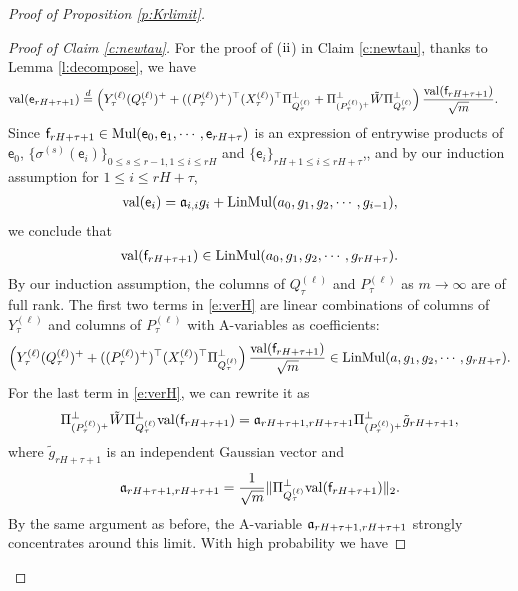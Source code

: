 \documentclass{article}
\numberwithin{equation}{section}
\newcommand{\fa}{{\frak a}}
\newcommand{\sfe}{{\mathsf e}}
\newcommand{\sff}{{\mathsf f}}
\renewcommand{\leq}{\leqslant}
\newcommand{\1}{\mathds{1}}
\theoremstyle{plain} %
\newcommand{\val}{{\rm val}}
\newcommand{\LinMul}{{\rm LinMul}}
\newcommand{\Mul}{{\rm Mul}}
\begin{document}
\begin{proof}[Proof of Proposition \ref{p:Krlimit}]
\begin{proof}[Proof of Claim \ref{c:newtau}]
For the proof of (${\rm ii}$) in Claim \ref{c:newtau}, thanks to Lemma \ref{l:decompose}, we have
\begin{align}\label{e:verH}
\val (\sfe_{rH+\tau+1})
&\stackrel{d}{=}
\left(Y_\tau^{(\ell)}(Q_\tau^{(\ell)})^++((P_\tau^{(\ell)})^+)^\top (X_\tau^{(\ell)})^\top\Pi_{Q_\tau^{(\ell)}}^\perp+\Pi_{(P_\tau^{(\ell)})^+}^\perp\tilde W\Pi_{Q_\tau^{(\ell)}}^\perp\right)\frac{\val(\sff_{rH+\tau+1})}{\sqrt m}.
\end{align}
Since $\sff_{r H +\tau+1}\in \Mul(\sfe_0, \sfe_1,\cdots, \sfe_{r H+\tau})$ is an expression of entrywise products of $\sfe_0$, $\{\sigma^{(s)}(\sfe_i)\}_{0\leq s\leq r-1, 1\leq i\leq rH}$ and $\{\sfe_i\}_{rH+1\leq i\leq rH+\tau}$,, and by our induction assumption for $1\leq i\leq rH+\tau$,
\begin{align*}
\val(\sfe_{i})=\fa_{i,i}g_{i}+\LinMul(a_0, g_1,g_2,\cdots, g_{i-1}),
\end{align*}
we conclude that 
\begin{align*}
\val(\sff_{r H +\tau+1})\in\LinMul(a_0, g_1,g_2,\cdots, g_{rH+\tau}).
\end{align*}
By our induction assumption, the columns of $Q_\tau^{(\ell)}$ and $P_\tau^{(\ell)}$ as $m\rightarrow \infty$ are of full rank. The first two terms in \eqref{e:verH} are linear combinations of columns of $Y_\tau^{(\ell)}$ and columns of $P_\tau^{(\ell)}$ with A-variables as coefficients:
\begin{align}\label{e:firsttwo}
\left(Y_\tau^{(\ell)}(Q_\tau^{(\ell)})^++((P_\tau^{(\ell)})^+)^\top (X_\tau^{(\ell)})^\top\Pi_{Q_\tau^{(\ell)}}^\perp\right)\frac{\val(\sff_{rH+\tau+1})}{\sqrt m}\in \LinMul(a, g_1,g_2,\cdots, g_{rH+\tau}).
\end{align}
For the last term in  \eqref{e:verH}, we can rewrite it as
\begin{align}\begin{split}\label{e:verH2}
\Pi_{(P_\tau^{(\ell)})^+}^\perp\tilde W\Pi_{Q_\tau^{(\ell)}}^\perp\val(\sff_{rH+\tau+1})=\fa_{rH+\tau+1,rH+\tau+1}\Pi_{(P_\tau^{(\ell)})^+}^\perp \tilde g_{rH+\tau+1},
\end{split}\end{align}
where $\tilde g_{rH+\tau+1}$ is an independent Gaussian vector and 
\begin{align*}
\fa_{rH+\tau+1,rH+\tau+1}=\frac{1}{\sqrt m}\|\Pi_{Q_\tau^{(\ell)}}^\perp\val(\sff_{rH+\tau+1})\|_2.
\end{align*}
By the same argument as before, the A-variable $\fa_{rH+\tau+1,rH+\tau+1}$ strongly concentrates around this limit. With high probability we have

\end{proof}
\end{proof}
\end{document}
